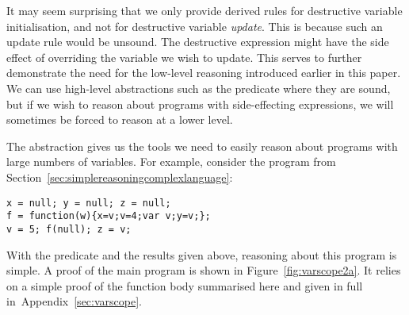 \documentclass{article}
\newcommand{\iflong}[1]{#1}
\newcommand{\ifshort}[1]{}
\begin{document}
It may seem surprising that we only provide derived rules for destructive variable
initialisation, and not for destructive variable \emph{update}. This is because
such an update rule %
 would be unsound. 
 The destructive expression might have the side effect of overriding the variable we wish to update.
This serves to further demonstrate the need for the low-level reasoning
introduced earlier in this paper. We can use high-level abstractions such as
the \store predicate where they are sound, but if we wish to reason about
programs with side-effecting expressions, we will sometimes be forced to reason
at a lower level.


%
The \store abstraction gives us the tools we need to easily reason about programs with large numbers of variables. For example, consider the program from Section~\ref{sec:simplereasoningcomplexlanguage}:

\begin{verbatim}
x = null; y = null; z = null;
f = function(w){x=v;v=4;var v;y=v;};
v = 5; f(null); z = v;
\end{verbatim}

With the \store predicate and the results  given above, reasoning about this
program is simple.  A proof of the main program is shown in
Figure~\ref{fig:varscope2a}. It relies on a simple proof of the
function body summarised here and given in full in~\ifshort{\cite{proofs}}\iflong{Appendix~\ref{sec:varscope}}.
\end{document}
